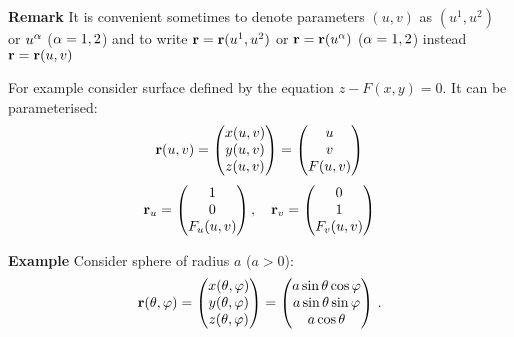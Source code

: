 \documentclass[12pt]{article}
\theoremstyle{theorem}
\numberwithin{equation}{section}
\begin{document}
  {\bf Remark}   It is convenient sometimes to denote
    parameters $(u,v)$ as $(u^1,u^2)$ or $u^\alpha$ ($\alpha=1,2$)
   and to write ${\bf r}={\bf r}(u^1,u^2)$ or ${\bf r}={\bf r}(u^\alpha)$ ($\alpha=1,2$)
   instead ${\bf r}={\bf r}(u,v)$

For example consider surface defined by the equation $z-F(x,y)=0$.
It can be parameterised:
\begin{equation}\label{generalsurface}
  {\bf r}(u,v)=
  \begin{pmatrix}
  x(u,v)\\
  y(u,v)\\
  z(u,v)\\
  \end{pmatrix}=
\begin{pmatrix}
       u\\
        v\\
       F(u,v)\\
  \end{pmatrix}
  \end{equation}
  \begin{equation}
       {\bf r}_u =
\begin{pmatrix}
                  1\\
                   0\\
                   F_u(u,v)\\
  \end{pmatrix},
  \quad
  {\bf r}_v=
\begin{pmatrix}
            0\\
           1\\
            F_v(u,v)\\
  \end{pmatrix}
\end{equation}

{\bf Example } Consider sphere of radius $a$ ($a>0$):
\begin{equation}\label{generalsurface}
  {\bf r}(\theta,\varphi)=
  \begin{pmatrix}
       x(\theta,\varphi)\\
        y(\theta,\varphi)\\
       z(\theta,\varphi)\\
  \end{pmatrix}
  =
  \begin{pmatrix}
  a\sin\theta\cos\varphi\\
   a\sin\theta\sin\varphi\\
  a\cos\theta\\
  \end{pmatrix}\,.
  \end{equation}
\end{document}
